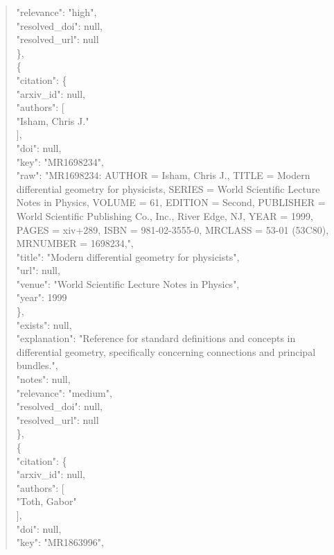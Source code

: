 \documentclass[11pt]{article}
\begin{document}
\begin{quote}
      "relevance": "high",\\
      "resolved\_doi": null,\\
      "resolved\_url": null\\
    \},\\
    \{\\
      "citation": \{\\
        "arxiv\_id": null,\\
        "authors": [\\
          "Isham, Chris J."\\
        ],\\
        "doi": null,\\
        "key": "MR1698234",\\
        "raw": "MR1698234: AUTHOR = Isham, Chris J., TITLE = Modern differential geometry for physicists, SERIES = World Scientific Lecture Notes in Physics, VOLUME = 61, EDITION = Second, PUBLISHER = World Scientific Publishing Co., Inc., River Edge, NJ, YEAR = 1999, PAGES = xiv+289, ISBN = 981-02-3555-0, MRCLASS = 53-01 (53C80), MRNUMBER = 1698234,",\\
        "title": "Modern differential geometry for physicists",\\
        "url": null,\\
        "venue": "World Scientific Lecture Notes in Physics",\\
        "year": 1999\\
      \},\\
      "exists": null,\\
      "explanation": "Reference for standard definitions and concepts in differential geometry, specifically concerning connections and principal bundles.",\\
      "notes": null,\\
      "relevance": "medium",\\
      "resolved\_doi": null,\\
      "resolved\_url": null\\
    \},\\
    \{\\
      "citation": \{\\
        "arxiv\_id": null,\\
        "authors": [\\
          "Toth, Gabor"\\
        ],\\
        "doi": null,\\
        "key": "MR1863996",\\

\end{quote}
\end{document}
